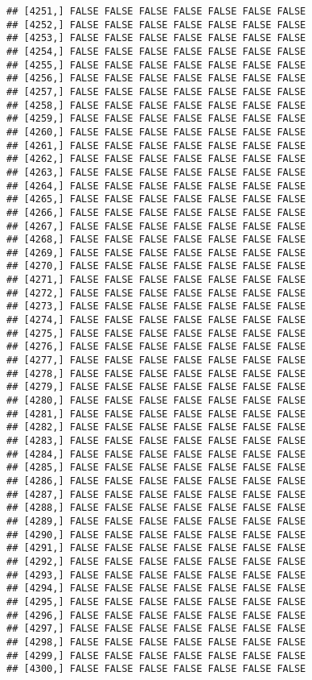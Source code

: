 \documentclass[
]{article}
\begin{document}
\begin{verbatim}
## [4251,] FALSE FALSE FALSE FALSE FALSE FALSE FALSE
## [4252,] FALSE FALSE FALSE FALSE FALSE FALSE FALSE
## [4253,] FALSE FALSE FALSE FALSE FALSE FALSE FALSE
## [4254,] FALSE FALSE FALSE FALSE FALSE FALSE FALSE
## [4255,] FALSE FALSE FALSE FALSE FALSE FALSE FALSE
## [4256,] FALSE FALSE FALSE FALSE FALSE FALSE FALSE
## [4257,] FALSE FALSE FALSE FALSE FALSE FALSE FALSE
## [4258,] FALSE FALSE FALSE FALSE FALSE FALSE FALSE
## [4259,] FALSE FALSE FALSE FALSE FALSE FALSE FALSE
## [4260,] FALSE FALSE FALSE FALSE FALSE FALSE FALSE
## [4261,] FALSE FALSE FALSE FALSE FALSE FALSE FALSE
## [4262,] FALSE FALSE FALSE FALSE FALSE FALSE FALSE
## [4263,] FALSE FALSE FALSE FALSE FALSE FALSE FALSE
## [4264,] FALSE FALSE FALSE FALSE FALSE FALSE FALSE
## [4265,] FALSE FALSE FALSE FALSE FALSE FALSE FALSE
## [4266,] FALSE FALSE FALSE FALSE FALSE FALSE FALSE
## [4267,] FALSE FALSE FALSE FALSE FALSE FALSE FALSE
## [4268,] FALSE FALSE FALSE FALSE FALSE FALSE FALSE
## [4269,] FALSE FALSE FALSE FALSE FALSE FALSE FALSE
## [4270,] FALSE FALSE FALSE FALSE FALSE FALSE FALSE
## [4271,] FALSE FALSE FALSE FALSE FALSE FALSE FALSE
## [4272,] FALSE FALSE FALSE FALSE FALSE FALSE FALSE
## [4273,] FALSE FALSE FALSE FALSE FALSE FALSE FALSE
## [4274,] FALSE FALSE FALSE FALSE FALSE FALSE FALSE
## [4275,] FALSE FALSE FALSE FALSE FALSE FALSE FALSE
## [4276,] FALSE FALSE FALSE FALSE FALSE FALSE FALSE
## [4277,] FALSE FALSE FALSE FALSE FALSE FALSE FALSE
## [4278,] FALSE FALSE FALSE FALSE FALSE FALSE FALSE
## [4279,] FALSE FALSE FALSE FALSE FALSE FALSE FALSE
## [4280,] FALSE FALSE FALSE FALSE FALSE FALSE FALSE
## [4281,] FALSE FALSE FALSE FALSE FALSE FALSE FALSE
## [4282,] FALSE FALSE FALSE FALSE FALSE FALSE FALSE
## [4283,] FALSE FALSE FALSE FALSE FALSE FALSE FALSE
## [4284,] FALSE FALSE FALSE FALSE FALSE FALSE FALSE
## [4285,] FALSE FALSE FALSE FALSE FALSE FALSE FALSE
## [4286,] FALSE FALSE FALSE FALSE FALSE FALSE FALSE
## [4287,] FALSE FALSE FALSE FALSE FALSE FALSE FALSE
## [4288,] FALSE FALSE FALSE FALSE FALSE FALSE FALSE
## [4289,] FALSE FALSE FALSE FALSE FALSE FALSE FALSE
## [4290,] FALSE FALSE FALSE FALSE FALSE FALSE FALSE
## [4291,] FALSE FALSE FALSE FALSE FALSE FALSE FALSE
## [4292,] FALSE FALSE FALSE FALSE FALSE FALSE FALSE
## [4293,] FALSE FALSE FALSE FALSE FALSE FALSE FALSE
## [4294,] FALSE FALSE FALSE FALSE FALSE FALSE FALSE
## [4295,] FALSE FALSE FALSE FALSE FALSE FALSE FALSE
## [4296,] FALSE FALSE FALSE FALSE FALSE FALSE FALSE
## [4297,] FALSE FALSE FALSE FALSE FALSE FALSE FALSE
## [4298,] FALSE FALSE FALSE FALSE FALSE FALSE FALSE
## [4299,] FALSE FALSE FALSE FALSE FALSE FALSE FALSE
## [4300,] FALSE FALSE FALSE FALSE FALSE FALSE FALSE

\end{verbatim}
\end{document}
